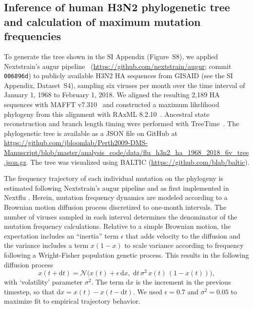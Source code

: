 \subsection*{Inference of human H3N2 phylogenetic tree and calculation of maximum mutation frequencies}
To generate the tree shown in the SI Appendix (Figure~S8), we applied Nextstrain's augur pipeline~\citep{Hadfield2018} (\url{https://github.com/nextstrain/augur}; commit \texttt{006896d}) to publicly available H3N2 HA sequences from GISAID \citep{shu2017gisaid} (see the SI Appendix, Dataset~S4), sampling six viruses per month over the time interval of January 1, 1968 to February 1, 2018.
We aligned the resulting 2,189 HA sequences with MAFFT v7.310~\citep{katoh2013mafft} and constructed a maximum likelihood phylogeny from this alignment with RAxML 8.2.10~\citep{stamatakis2006raxml}.
Ancestral state reconstruction and branch length timing were performed with TreeTime~\citep{Sagulenko2018}.
The phylogenetic tree is available as a JSON file on GitHub at \url{https://github.com/jbloomlab/Perth2009-DMS-Manuscript/blob/master/analysis_code/data/flu_h3n2_ha_1968_2018_6v_tree.json.gz}.
The tree was visualized using BALTIC (\url{https://github.com/blab/baltic}).

\newcommand{\dx}{\mathrm{d}x}						%
\newcommand{\dy}{\mathrm{d}y}						%
\newcommand{\dt}{\mathrm{d}t}						%
\newcommand{\inertia}{\epsilon}			    %
\newcommand{\normal}{\mathcal{N}}				%

The frequency trajectory of each individual mutation on the phylogeny is estimated following Nextstrain's augur pipeline and as first implemented in Nextflu \citep{Neher:2015jr}.
Herein, mutation frequency dynamics are modeled according to a Brownian motion diffusion process discretized to one-month intervals.
The number of viruses sampled in each interval determines the denominator of the mutation frequency calculations.
Relative to a simple Brownian motion, the expectation includes an ``inertia'' term $\inertia$ that adds velocity to the diffusion and the variance includes a term $x(1-x)$ to scale variance according to frequency following a Wright-Fisher population genetic process.
This results in the following diffusion process
\begin{equation}
x(t+\dt) = \normal\big( x(t) + \inertia \, \dx , \; \dt \, \sigma^2 \, x(t) \, (1-x(t)) \big),
\end{equation}
with `volatility' parameter $\sigma^2$.
The term $\dx$ is the increment in the previous timestep, so that $\dx = x(t) - x(t-\dt)$.
We used $\inertia = 0.7$ and $\sigma^2 = 0.05$ to maximize fit to empirical trajectory behavior.

